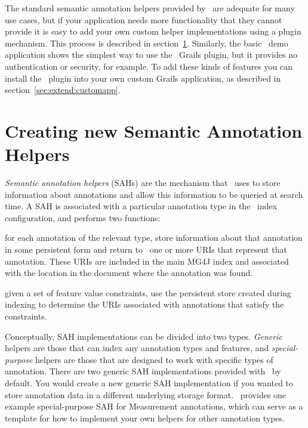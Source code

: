 The standard semantic annotation helpers provided by \Mimir\ are adequate for
many use cases, but if your application needs more functionality that they
cannot provide it is easy to add your own custom helper implementations using a
plugin mechanism.  This process is described in
section~\ref{sec:extend:helpers}.  Similarly, the basic \Mimir\ demo
application shows the simplest way to use the \Mimir\ Grails plugin, but it
provides no authentication or security, for example.  To add these kinds of
features you can install the \Mimir\ plugin into your own custom Grails
application, as described in section~\ref{sec:extend:customapp}.

\section{Creating new Semantic Annotation Helpers}\label{sec:extend:helpers}

{\em Semantic annotation helpers} (SAHs) are the mechanism that \Mimir\ uses to
store information about annotations and allow this information to be queried at
search time.  A SAH is associated with a particular annotation type in the
\Mimir\ index configuration, and performs two functions:

\bde
\item[During indexing] for each annotation of the relevant type, store
  information about that annotation in some persistent form and return to
  \Mimir\ one or more URIs that represent that annotation.  These URIs are
  included in the main MG4J index and associated with the location
  in the document where the annotation was found.
\item[During searching] given a set of feature value constraints, use the
  persistent store created during indexing to determine the URIs associated
  with annotations that satisfy the constraints.
\ede

Conceptually, SAH implementations can be divided into two types.
{\em Generic} helpers are those that can index any annotation types and
features, and {\em special-purpose} helpers are those that are designed to work
with specific types of annotation.  There are two generic SAH implementations
provided with \Mimir\ by default.  You would create a new generic SAH
implementation if you wanted to store annotation data in a different underlying
storage format.  \Mimir\ provides one example special-purpose SAH for
Measurement annotations, which can serve as a template for how to implement
your own helpers for other annotation types.

